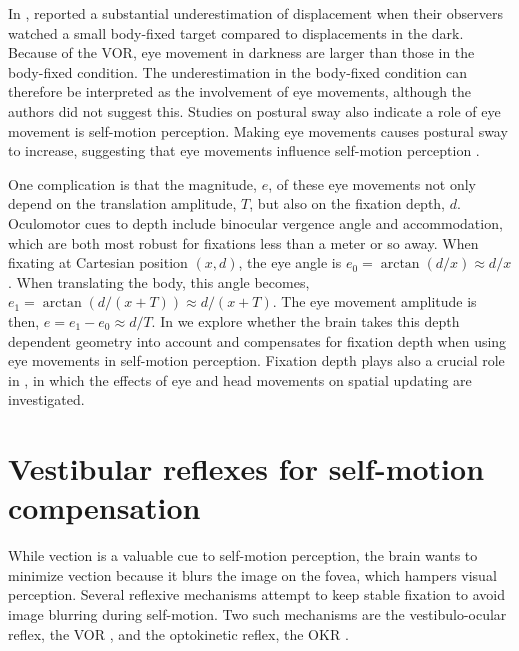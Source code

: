 In , \citeauthor{guedry1963} reported a substantial underestimation of displacement when their observers watched a small body-fixed target compared to displacements in the dark. Because of the VOR, eye movement in darkness are larger than those in the body-fixed condition. The underestimation in the body-fixed condition can therefore be interpreted as the involvement of eye movements, although the authors did not suggest this. Studies on postural sway also indicate a role of eye movement is self-motion perception. Making eye movements causes postural sway to increase, suggesting that eye movements influence self-motion perception \cite{glasauer2005,rodrigues2015}.

One complication is that the magnitude, $e$, of these eye movements not only depend on the translation amplitude, $T$, but also on the fixation depth, $d$. Oculomotor cues to depth include binocular vergence angle and accommodation, which are both most robust for fixations less than a meter or so away. When fixating at Cartesian position $(x, d)$, the eye angle is $e_0 = \arctan(d/x) \approx d/x$. When translating the body, this angle becomes, $e_1 = \arctan(d/(x+T)) \approx d/(x+T)$. The eye movement amplitude is then, $e = e_1 - e_0 \approx d/T$. In  we explore whether the brain takes this depth dependent geometry into account and compensates for fixation depth when using eye movements in self-motion perception. Fixation depth plays also a crucial role in , in which the effects of eye and head movements on spatial updating are investigated.


\section{Vestibular reflexes for self-motion compensation}
While vection is a valuable cue to self-motion perception, the brain wants to minimize vection because it blurs the image on the fovea, which hampers visual perception. Several reflexive mechanisms attempt to keep stable fixation to avoid image blurring during self-motion. Two such mechanisms are the vestibulo-ocular reflex, the VOR \cite{goldberg2012}, and the optokinetic reflex, the OKR \cite{purves2012}.

